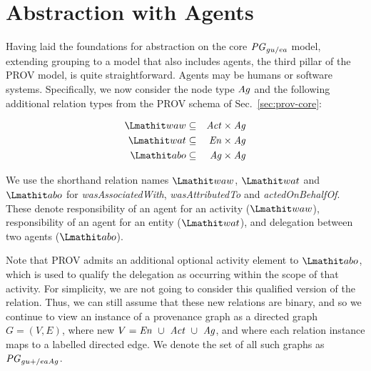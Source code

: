 
\section{Abstraction with Agents}  \label{sec:agents-abstraction}


Having laid the foundations for abstraction on the core $\mathit{PG}_{gu/ea}$ model, extending grouping to a model that also includes agents, the third pillar of the PROV model, is quite straightforward. Agents may be humans or software systems. 
%
Specifically, we now consider the node type $\mathit{Ag}$ and the following additional relation types from the PROV schema of Sec.~\ref{sec:prov-core}:

\begin{eqnarray*}
\waw      & \subseteq & \act \times \ag \\
\attrTo   & \subseteq & \en \times \ag \\
\delegate & \subseteq & \ag \times \ag  
\end{eqnarray*}
%

We use the shorthand relation names $\waw$,  $\attrTo$ and $\delegate$  for \textit{wasAssociatedWith},  \textit{wasAttributedTo} and \textit{actedOnBehalfOf}. These denote responsibility of an agent for an activity ($\waw$), responsibility of an agent for an entity ($\attrTo$), and delegation between two agents ($\delegate$). 
%

Note that PROV admits an additional optional activity element to $\delegate$, which is used to  qualify the delegation as occurring within the scope of that activity. For simplicity, we are not going to consider this qualified version of the relation.
%
Thus, we can still assume that these new relations are binary, and so we continue to view an instance of a provenance graph as a directed graph $G=(V,E)$, where new $V= \mathit{En} ~\cup~ \mathit{Act} ~\cup~ \mathit{Ag}$, and where each relation instance maps to a labelled directed edge.  We denote the set of all such graphs as $\mathit{PG}_{gu+/eaAg}$.

